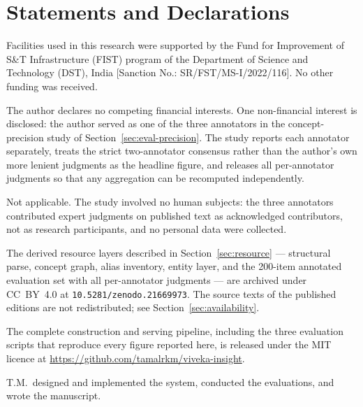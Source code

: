 \documentclass[pdflatex,sn-mathphys-num]{sn-jnl}
\begin{document}
\section*{Statements and Declarations}

Facilities used in this research were supported by the Fund for
Improvement of S\&T Infrastructure (FIST) program of the Department of
Science and Technology (DST), India [Sanction No.:
SR/FST/MS-I/2022/116]. No other funding was received.

The author declares no competing financial interests. One
non-financial interest is disclosed: the author served as one of the
three annotators in the concept-precision study of
Section~\ref{sec:eval-precision}. The study reports each annotator
separately, treats the strict two-annotator consensus rather than the
author's own more lenient judgments as the headline figure, and releases
all per-annotator judgments so that any aggregation can be recomputed
independently.

Not applicable. The study involved no human subjects: the three
annotators contributed expert judgments on published text as
acknowledged contributors, not as research participants, and no personal
data were collected.

The derived resource layers described in Section~\ref{sec:resource} ---
structural parse, concept graph, alias inventory, entity layer, and the
200-item annotated evaluation set with all per-annotator judgments ---
are archived under CC~BY~4.0 at \texttt{10.5281/zenodo.21669973}. The source texts of
the published editions are not redistributed; see
Section~\ref{sec:availability}.

The complete construction and serving pipeline, including the three
evaluation scripts that reproduce every figure reported here, is
released under the MIT licence at \url{https://github.com/tamalrkm/viveka-insight}.

T.M.\ designed and implemented the system, conducted the evaluations, and
wrote the manuscript.
\end{document}
